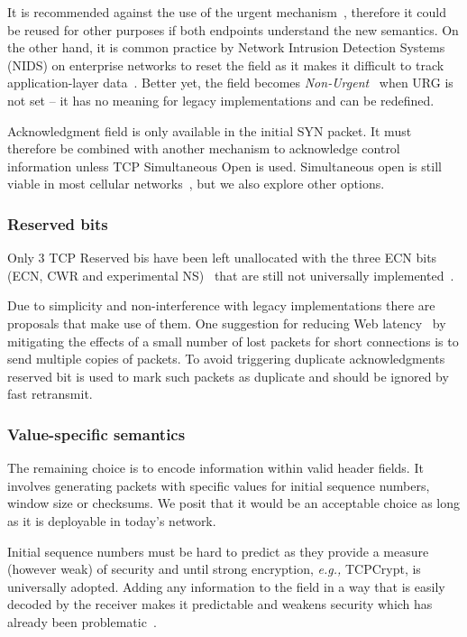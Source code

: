 \documentclass{sig-alternate-10pt}
\providecommand{\eg}{\emph{e.g.,} }
\begin{document}
It is recommended against the use of the urgent mechanism~\cite{Gont:2011vi}, therefore it could be reused for other purposes if both endpoints understand the new semantics. On the other hand, it is common practice by Network Intrusion Detection Systems (NIDS) on enterprise networks to reset the field as it makes it difficult to track application-layer data~\cite{seolma}. Better yet, the field becomes \emph{Non-Urgent}~\cite{Kuhlewind:2014vd} when URG is not set -- it has no meaning for legacy implementations and can be redefined.

Acknowledgment field is only available in the initial SYN packet. It must therefore be combined with another mechanism to acknowledge control information unless TCP Simultaneous Open is used. Simultaneous open is still viable in most cellular networks~\cite{UntoldMiddlebox2011}, but we also explore other options.

\subsubsection*{Reserved bits}

Only 3 TCP Reserved bis have been left unallocated with the three ECN bits (ECN, CWR and experimental NS)~\cite{Floyd:up,Ely:uc} that are still not universally implemented~\cite{Kuhlewind:2013hr}.

Due to simplicity and non-interference with legacy implementations there are proposals that make use of them. One suggestion for reducing Web latency~\cite{Flach:2013uy} by mitigating the effects of a small number of lost packets for short connections is to send multiple copies of packets. To avoid triggering duplicate acknowledgments reserved bit is used to mark such packets as duplicate and should be ignored by fast retransmit.

\subsubsection*{Value-specific semantics}

The remaining choice is to encode information within valid header fields. It involves generating packets with specific values for initial sequence numbers, window size or checksums. We posit that it would be an acceptable choice as long as it is deployable in today's network.

Initial sequence numbers must be hard to predict as they provide a measure (however weak) of security and until strong encryption, \eg TCPCrypt, is universally adopted. Adding any information to the field in a way that is easily decoded by the receiver makes it predictable and weakens security  which has already been problematic~\cite{Qian:2012bj,Bellovin:uz,Qian:2012wb}. 
\end{document}
